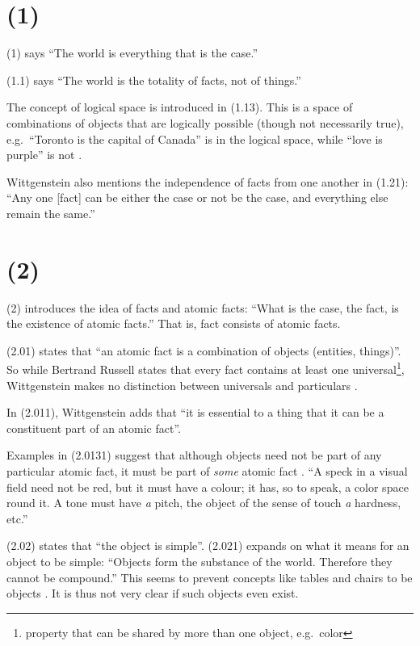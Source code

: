 \documentclass{article}
\newcommand{\prop}[1]{(#1)}
\begin{document}
\section*{\prop{1}}

\prop{1} says ``The world is everything that is the case.''

\prop{1.1} says ``The world is the totality of facts, not of things.''

The concept of logical space is introduced in \prop{1.13}. This is a space of combinations of objects that are logically possible (though not necessarily true), e.g.\ ``Toronto is the capital of Canada'' is in the logical space, while ``love is purple'' is not \cite{Vi2019}.

Wittgenstein also mentions the independence of facts from one another in \prop{1.21}: ``Any one [fact] can be either the case or not be the case, and everything else remain the same.''

\section*{\prop{2}}

\prop{2} introduces the idea of facts and atomic facts: ``What is the case, the fact, is the existence of atomic facts.''
That is, fact consists of atomic facts.

\prop{2.01} states that ``an atomic fact is a combination of objects (entities, things)''.
So while Bertrand Russell states that every fact contains at least one universal\footnote{property that can be shared by more than one object, e.g.\ color}, Wittgenstein makes no distinction between universals and particulars \cite{Sp2007}.

In \prop{2.011}, Wittgenstein adds that ``it is essential to a thing that it can be a constituent part of an atomic fact''.

Examples in \prop{2.0131} suggest that although objects need not be part of any particular atomic fact, it must be part of \emph{some} atomic fact \cite{Sp}.
``A speck in a visual field need not be red, but it must have a colour; it has, so to speak, a color space round it.
A tone must have \emph{a} pitch, the object of the sense of touch \emph{a} hardness, etc.''

\prop{2.02} states that ``the object is simple''.
\prop{2.021} expands on what it means for an object to be simple: ``Objects form the substance of the world. Therefore they cannot be compound.''
This seems to prevent concepts like tables and chairs to be objects \cite{Vi2019}.
It is thus not very clear if such objects even exist.
\end{document}
